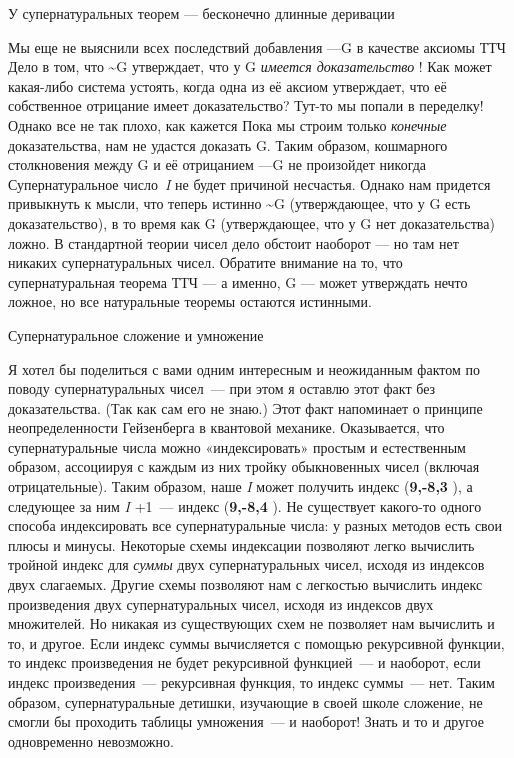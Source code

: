 \documentclass[../main.tex]{subfiles}
\begin{document}
У супернатуральных теорем --- бесконечно длинные деривации

Мы еще не выяснили всех последствий добавления ---G в качестве аксиомы ТТЧ Дело в том, что \textasciitilde G утверждает, что у G \emph{имеется доказательство} ! Как может какая-либо система устоять, когда одна из её аксиом утверждает, что её собственное отрицание имеет доказательство? Тут-то мы попали в переделку! Однако все не так плохо, как кажется Пока мы строим только \emph{конечные} доказательства, нам не удастся доказать G. Таким образом, кошмарного столкновения между G и её отрицанием ---G не произойдет никогда Супернатуральное число~\emph{I} не будет причиной несчастья. Однако нам придется привыкнуть к мысли, что теперь истинно \textasciitilde G (утверждающее, что у G есть доказательство), в то время как G (утверждающее, что у G нет доказательства) ложно. В стандартной теории чисел дело обстоит наоборот --- но там нет никаких супернатуральных чисел. Обратите внимание на то, что супернатуральная теорема ТТЧ --- а именно, G --- может утверждать нечто ложное, но все натуральные теоремы остаются истинными.

Супернатуральное сложение и умножение

Я хотел бы поделиться с вами одним интересным и неожиданным фактом по поводу супернатуральных чисел~--- при этом я оставлю этот факт без доказательства. (Так как сам его не знаю.) Этот факт напоминает о принципе неопределенности Гейзенберга в квантовой механике. Оказывается, что супернатуральные числа можно «индексировать» простым и естественным образом, ассоциируя с каждым из них тройку обыкновенных чисел (включая отрицательные). Таким образом, наше \emph{I} может получить индекс (\textbf{9,-8,3} ), а следующее за ним \emph{I} +1~--- индекс (\textbf{9,-8,4} ). Не существует какого-то одного способа индексировать все супернатуральные числа: у разных методов есть свои плюсы и минусы. Некоторые схемы индексации позволяют легко вычислить тройной индекс для \emph{суммы} двух супернатуральных чисел, исходя из индексов двух слагаемых. Другие схемы позволяют нам с легкостью вычислить индекс произведения двух супернатуральных чисел, исходя из индексов двух множителей. Но никакая из существующих схем не позволяет нам вычислить и то, и другое. Если индекс суммы вычисляется с помощью рекурсивной функции, то индекс произведения не будет рекурсивной функцией~--- и наоборот, если индекс произведения~--- рекурсивная функция, то индекс суммы~--- нет. Таким образом, супернатуральные детишки, изучающие в своей школе сложение, не смогли бы проходить таблицы умножения~--- и наоборот! Знать и то и другое одновременно невозможно.
\end{document}
